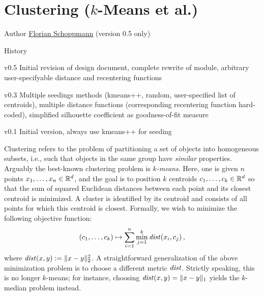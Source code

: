
\chapter[Clustering (k-means et al.)]{Clustering ($k$-Means et al.)}

\begin{moduleinfo}
\item[Author] \href{mailto:Florian.Schoppmann@emc.com}{Florian Schoppmann} (version 0.5 only)
\item[History]
	\begin{modulehistory}
		\item[v0.5] Initial revision of design document, complete rewrite of module, arbitrary user-specifyable distance and recentering functions
		\item[v0.3] Multiple seedings methods (kmeans++, random, user-specified list of centroids), multiple distance functions (corresponding recentering function hard-coded), simplified silhouette coefficient as goodness-of-fit measure
		\item[v0.1] Initial version, always use kmeans++ for seeding
	\end{modulehistory}
\end{moduleinfo}


Clustering refers to the problem of partitioning a set of objects into homogeneous subsets, i.e., such that objects in the same group have \emph{similar} properties. Arguably the best-known clustering problem is \emph{$k$-means}. Here, one is given $n$ points $x_1, \dots, x_n \in \mathbb{R}^d$, and the goal is to position $k$ centroids $c_1, \dots, c_k \in \mathbb{R}^d$ so that the sum of squared Euclidean distances between each point and its closest centroid is minimized. A cluster is identified by its centroid and consists of all points for which this centroid is closest. Formally, we wish to minimize the following objective function:
\begin{gather*}
    (c_1, \dots, c_k) \mapsto \sum_{i=1}^n \min_{j=1}^k \dist(x_i, c_j) \SiM,
\end{gather*}
where $\mathit{dist}(x,y) := \| x - y \|_2^2$. A straightforward generalization of the above minimization problem is to choose a different metric $\mathit{dist}$. Strictly speaking, this is no longer $k$-means; for instance, choosing $\mathit{dist}(x,y) = \| x - y\|_1$ yields the $k$-median problem instead.

